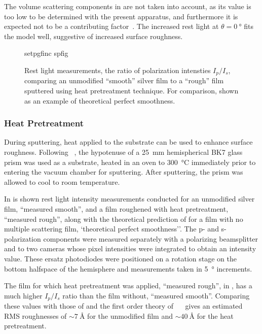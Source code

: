 The volume scattering components in  are not taken
into account, as its value is too low to be determined with the present
apparatus, and furthermore it is expected not to be a contributing
factor~\cite{kretschmann1972decay}.  The increased rest light at
$\theta=\SI{0}{\degree}$ fits the model well, suggestive of increased
surface roughness.
\begin{figure}[ht]
 \centering
 {setpgfinc}
 {spfig}
 \caption{Rest light measurements, the ratio of polarization intensties
									$I_p/I_s$,  comparing an unmodified ``smooth'' silver film
									to a ``rough'' film sputtered using heat pretreatment
									technique.  For comparison,  shown
									as an example of theoretical perfect smoothness.}
\label{fig:spratio}
\end{figure}

\subsubsection{Heat Pretreatment}
During sputtering, heat applied to the substrate can be used to enhance
surface roughness.  Following ~\cite{horstmann1977multiple},
the hypotenuse of a \SI{25}{\milli\meter} hemispherical BK7 glass prism was
used as a substrate, heated in an oven to \SI{300}{\celsius} immediately prior
to entering the vacuum chamber for sputtering.  After sputtering, the prism
was allowed to cool to room temperature.

In  is shown rest light intensity measurements conducted
for an unmodified silver film, ``measured smooth'', and a film roughened with
heat pretreatment, ``measured rough'', along with the theoretical prediction
of  for a film with no multiple scattering film,
`theoretical perfect smoothness''.  The p- and s-polarization components were
measured separately with a polarizing beamsplitter and to two cameras whose
pixel intensities were integrated to obtain an intensity value.  These ersatz
photodiodes were positioned on a rotation stage on the bottom halfspace of the
hemisphere and measurements taken in \SI{5}{\degree} increments.

The film for which heat pretreatment was applied, ``measured rough'', in
, has a much higher $I_p/I_s$ ratio than the film without,
``measured smooth''.  Comparing these values with those of 
and the first order theory of
~\cite{kroger1970scattering}~\cite{horstmann1977multiple} gives
an estimated RMS roughnesses of $\sim\SI{7}{\angstrom}$ for the unmodified
film and $\sim\SI{40}{\angstrom}$ for the heat pretreatment.

